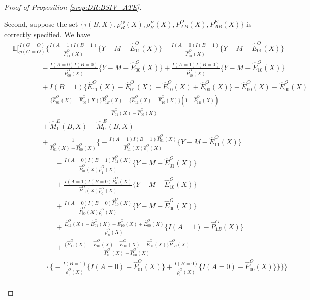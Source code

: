 \documentclass[10pt]{article}
\newcommand{\E}{\mathbb{E}}
\begin{document}
\begin{proof}[Proof of Proposition \ref{prop:DR:BSIV_ATE}]
\begin{itemize}
Second, suppose the set $\{\tau(B,X),\rho_B^O(X),\rho_B^E(X),P_{AB}^O(X),P_{AB}^E(X)\}$ is correctly specified. We have
    \begingroup
\allowdisplaybreaks
{\footnotesize \begin{align*}
&\E\Big[\frac{I(G=O)}{p(G=O)}\Bigg\{\frac{I(A=1)I(B=1)}{\hat{P}_{11}^O(X)}\{Y-M-\hat{E}_{11}^O(X)\}-\frac{I(A=0)I(B=1)}{\hat{P}_{01}^O(X)}\{Y-M-\hat{E}_{01}^O(X)\}\\
    &\ \ \ \ \ \ \ \ \ \ \ \ \ \ \ \ \ \ -\frac{I(A=0)I(B=0)}{\hat{P}_{00}^O(X)}\{Y-M-\hat{E}_{00}^O(X)\}+\frac{I(A=1)I(B=0)}{\hat{P}_{10}^O(X)}\{Y-M-\hat{E}_{10}^O(X)\}\\
    &\ \ \ \ \ \ \ \ \ \ \ \ \ \ \ \ \ \ +I(B=1)\{\hat{E}_{11}^O(X)-\hat{E}_{01}^O(X)-\hat{E}_{10}^O(X)+\hat{E}_{00}^O(X)\}+\hat{E}_{10}^O(X)-\hat{E}_{00}^O(X)\\
    &\ \ \ \ \ \ \ \ \ \ \ \ \ \ \ \ \ \ -\frac{\{\hat{E}_{01}^O(X)-\hat{E}_{00}^O(X)\}\hat{P}_{1B}^O(X)+\{\hat{E}_{11}^O(X)-\hat{E}_{10}^O(X)\}(1-\hat{P}_{1B}^O(X))}{\hat{P}_{01}^O(X)-\hat{P}_{00}^O(X)}\\
    &\ \ \ \ \ \ \ \ \ \ \ \ \ \ \ \ \ \ +\hat{M}_1^E(B,X)-\hat{M}_0^E(B,X)\\
    &\ \ \ \ \ \ \ \ \ \ \ \ \ \ \ \ \ \ +\frac{1}{\hat{P}_{01}^O(X)-\hat{P}_{00}^O(X)}\bigg\{-\frac{I(A=1)I(B=1)\hat{P}_{01}^O(X)}{\hat{P}_{11}^O(X)\hat{\rho}_1^O(X)}\{Y-M-\hat{E}_{11}^O(X)\}\\
    &~~~~~~~~~~~~~~~~~~~~~~~~~~~-\frac{I(A=0)I(B=1)\hat{P}_{11}^O(X)}{\hat{P}_{01}^O(X)\hat{\rho}_1^O(X)}\{Y-M-\hat{E}_{01}^O(X)\}\\
    &~~~~~~~~~~~~~~~~~~~~~~~~~~~+\frac{I(A=1)I(B=0)\hat{P}_{00}^O(X)}{\hat{P}_{10}^O(X)\hat{\rho}_0^O(X)}\{Y-M-\hat{E}_{10}^O(X)\}\\
    &~~~~~~~~~~~~~~~~~~~~~~~~~~~+\frac{I(A=0)I(B=0)\hat{P}_{10}^O(X)}{\hat{P}_{00}^O(X)\hat{\rho}_0^O(X)}\{Y-M-\hat{E}_{00}^O(X)\}\\
    &~~~~~~~~~~~~~~~~~~~~~~~~~~~+\frac{\hat{E}_{11}^O(X)-\hat{E}_{01}^O(X)-\hat{E}_{10}^O(X)+\hat{E}_{00}^O(X)}{\hat{\rho}_B^O(X)}\big\{I(A=1)-\hat{P}_{1B}^O(X)\big\}\\
    &~~~~~~~~~~~~~~~~~~~~~~~~~~~ +\frac{\{\hat{E}_{11}^O(X)-\hat{E}_{01}^O(X)-\hat{E}_{10}^O(X)+\hat{E}_{00}^O(X)\}\hat{P}_{1B}^O(X)}{\hat{P}_{01}^O(X)-\hat{P}_{00}^O(X)}\\
    &~~~~~~~~~~~~~~~~~~~~~\cdot\big\{-\frac{I(B=1)}{\hat{\rho}_1^O(X)}\{I(A=0)-\hat{P}_{01}^O(X)\}+\frac{I(B=0)}{\hat{\rho}_0^O(X)}\{I(A=0)-\hat{P}_{00}^O(X)\}\big\}\bigg\}\Bigg\}\\

\end{align*}}
\end{itemize}
\end{proof}
\end{document}

